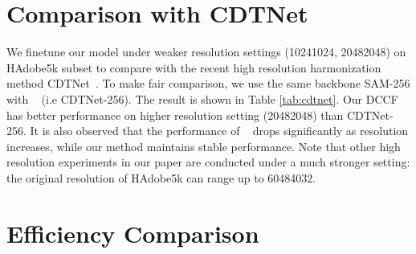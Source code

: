 \documentclass[runningheads]{llncs}
\begin{document}
\section{Comparison with CDTNet}

We finetune our model under weaker resolution settings (10241024, 20482048) on HAdobe5k subset to compare with the recent high resolution harmonization method CDTNet~\cite{CDTNet}. To make fair comparison, we use the same backbone SAM-256 with ~\cite{CDTNet} (i.e CDTNet-256). The result is shown in Table \ref{tab:cdtnet}. Our DCCF has better performance on higher resolution setting (20482048) than CDTNet-256. It is also observed that the performance of ~\cite{CDTNet} drops significantly as resolution increases, while our method maintains stable performance. Note that other high resolution experiments in our paper are conducted under a much stronger setting: the original resolution of HAdobe5k can range up to 60484032.

   \begin{table}[!htb]
        \scriptsize
            \centering
            \vspace{-5pt}
              \vspace{7pt}
              \caption{\textbf{Quantative comparison} with CDTNet~\cite{CDTNet} on HAdobe5k subset.}
              \label{tab:cdtnet}
        
    \end{table}

\section{Efficiency Comparison}
\label{sec:high-res-efficiency}
\end{document}
